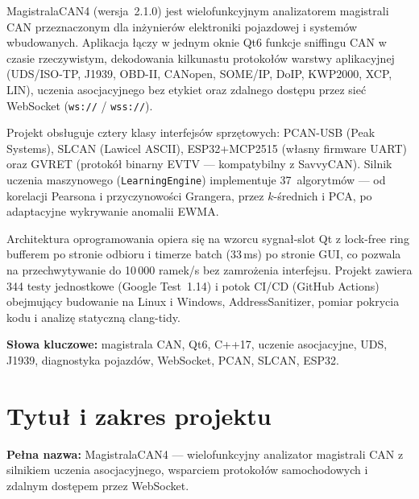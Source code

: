 \documentclass[12pt, a4paper]{article}
\begin{document}
MagistralaCAN4 (wersja~2.1.0) jest wielofunkcyjnym analizatorem magistrali CAN
przeznaczonym dla inżynierów elektroniki pojazdowej i systemów wbudowanych.
Aplikacja łączy w jednym oknie Qt6 funkcje sniffingu CAN w czasie rzeczywistym,
dekodowania kilkunastu protokołów warstwy aplikacyjnej
(UDS/ISO-TP, J1939, OBD-II, CANopen, SOME/IP, DoIP, KWP2000, XCP, LIN),
uczenia asocjacyjnego bez etykiet oraz zdalnego dostępu przez sieć WebSocket
(\texttt{ws://} / \texttt{wss://}).

Projekt obsługuje cztery klasy interfejsów sprzętowych: PCAN-USB (Peak Systems),
SLCAN (Lawicel ASCII), ESP32+MCP2515 (własny firmware UART) oraz GVRET
(protokół binarny EVTV --- kompatybilny z SavvyCAN).
Silnik uczenia maszynowego (\texttt{LearningEngine}) implementuje 37~algorytmów ---
od korelacji Pearsona i przyczynowości Grangera, przez $k$-średnich i PCA,
po adaptacyjne wykrywanie anomalii EWMA.

Architektura oprogramowania opiera się na wzorcu sygnał-slot Qt z lock-free
ring bufferem po stronie odbioru i timerze batch (33\,ms) po stronie GUI,
co pozwala na przechwytywanie do 10\,000 ramek/s bez zamrożenia interfejsu.
Projekt zawiera 344 testy jednostkowe (Google Test~1.14) i potok CI/CD
(GitHub Actions) obejmujący budowanie na Linux i Windows, AddressSanitizer,
pomiar pokrycia kodu i analizę statyczną clang-tidy.

\bigskip
\noindent\textbf{Słowa kluczowe:}
magistrala CAN, Qt6, C++17, uczenie asocjacyjne, UDS, J1939, diagnostyka
pojazdów, WebSocket, PCAN, SLCAN, ESP32.

\clearpage
\tableofcontents

\clearpage
\listoffigures

\clearpage
\listoftables

\clearpage
{}
\setcounter{page}{1}

\section{Tytuł i zakres projektu}

\textbf{Pełna nazwa:} MagistralaCAN4 --- wielofunkcyjny analizator magistrali CAN
z silnikiem uczenia asocjacyjnego, wsparciem protokołów samochodowych
i zdalnym dostępem przez WebSocket.
\end{document}
